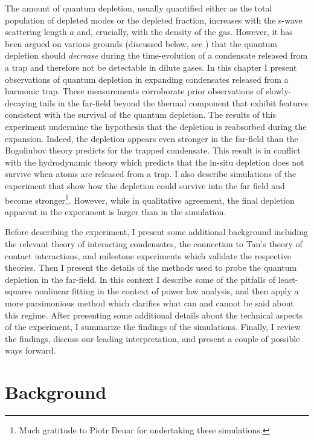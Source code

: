 	The amount of quantum depletion, usually quantified either as the total population of depleted modes or the depleted fraction, increases with the s-wave scattering length $a$ and, crucially, with the density of the gas. 
	However, it has been argued on various grounds (discussed below, see \cite{Xu06,Qu16}) that the quantum depletion should \emph{decrease} during the time-evolution of a condensate released from a trap and therefore not be detectable in dilute gases.
	In this chapter I present observations of quantum depletion in expanding condensates released from a harmonic trap. 
	These measurements corroborate prior observations \cite{Chang16} of slowly-decaying tails in the far-field beyond the thermal component that exhibit features consistent with the survival of the quantum depletion. 
	The results of this experiment undermine the hypothesis that the depletion is reabsorbed during the expansion. 
	Indeed, the depletion appears even stronger in the far-field than the Bogoliubov theory predicts for the trapped condensate. 
	This result is in conflict with the hydrodynamic theory which predicts that the in-situ depletion does not survive when atoms are released from a trap.  
	I also describe simulations of the experiment that show how the depletion could survive into the far field and become stronger\footnote{Much gratitude to Piotr Deuar for undertaking these simulations.}. 
	However, while in qualitative agreement, the final depletion apparent in the experiment is larger than in the simulation.

	Before describing the experiment, I present some additional background including the relevant theory of interacting condensates, the connection to Tan's theory of contact interactions, and milestone experiments which validate the respective theories. Then I present the details of the methods used to probe the quantum depletion in the far-field. In this context I describe some of the pitfalls of least-squares nonlinear fitting in the context of power law analysis, and then apply a more parsimonious method which clarifies what can and cannot be said about this regime. After presenting some additional details about the technical aspects of the experiment, I summarize the findings of the simulations. Finally, I review the findings, discuss our leading interpretation, and present a couple of possible ways forward.

\section{Background}


